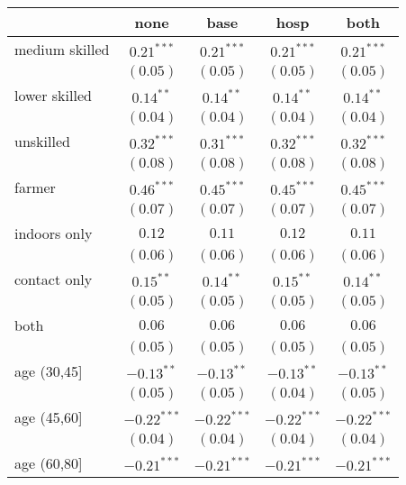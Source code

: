 
\begin{table}[h!]
\begin{center}
\begin{small}
\begin{tabular}{l c c c c}
\hline
 & none & base & hosp & both \\
\hline
medium skilled     & $0.21^{***}$  & $0.21^{***}$  & $0.21^{***}$  & $0.21^{***}$  \\
                   & $(0.05)$      & $(0.05)$      & $(0.05)$      & $(0.05)$      \\
lower skilled      & $0.14^{**}$   & $0.14^{**}$   & $0.14^{**}$   & $0.14^{**}$   \\
                   & $(0.04)$      & $(0.04)$      & $(0.04)$      & $(0.04)$      \\
unskilled          & $0.32^{***}$  & $0.31^{***}$  & $0.32^{***}$  & $0.32^{***}$  \\
                   & $(0.08)$      & $(0.08)$      & $(0.08)$      & $(0.08)$      \\
farmer             & $0.46^{***}$  & $0.45^{***}$  & $0.45^{***}$  & $0.45^{***}$  \\
                   & $(0.07)$      & $(0.07)$      & $(0.07)$      & $(0.07)$      \\
indoors only       & $0.12$        & $0.11$        & $0.12$        & $0.11$        \\
                   & $(0.06)$      & $(0.06)$      & $(0.06)$      & $(0.06)$      \\
contact only       & $0.15^{**}$   & $0.14^{**}$   & $0.15^{**}$   & $0.14^{**}$   \\
                   & $(0.05)$      & $(0.05)$      & $(0.05)$      & $(0.05)$      \\
both               & $0.06$        & $0.06$        & $0.06$        & $0.06$        \\
                   & $(0.05)$      & $(0.05)$      & $(0.05)$      & $(0.05)$      \\
age (30,45]        & $-0.13^{**}$  & $-0.13^{**}$  & $-0.13^{**}$  & $-0.13^{**}$  \\
                   & $(0.05)$      & $(0.05)$      & $(0.04)$      & $(0.05)$      \\
age (45,60]        & $-0.22^{***}$ & $-0.22^{***}$ & $-0.22^{***}$ & $-0.22^{***}$ \\
                   & $(0.04)$      & $(0.04)$      & $(0.04)$      & $(0.04)$      \\
age (60,80]        & $-0.21^{***}$ & $-0.21^{***}$ & $-0.21^{***}$ & $-0.21^{***}$ \\

\end{tabular}
\end{small}
\end{center}
\end{table}

